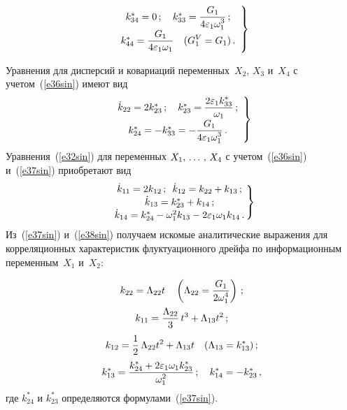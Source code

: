 \begin{multicols}{2}
\noindent
    \begin{equation}
    \left.
    \begin{array}{c}
    k_{34}^* =0\,;\quad k_{33}^* =\displaystyle\frac{\displaystyle G_1\mathstrut}{\displaystyle 4\varepsilon_1 \omega_1^3\mathstrut}\,;\\[3pt]
 k_{44}^* = \displaystyle\frac{\displaystyle G_1\mathstrut}{\displaystyle 4\varepsilon_1 \omega_1\mathstrut}\quad
    (G_1^{V} =G_1)\,.
    \end{array}
    \right \}
    \label{e36sin}
    \end{equation}

Уравнения для дисперсий и ковариаций переменных~$X_2$, $X_3$ и~$X_4$ с учетом~(\ref{e36sin}) имеют вид
          \begin{equation}
    \left.
    \begin{array}{c}
    \dot k_{22} = 2 k_{23}^*\,;\quad k_{23}^* = \displaystyle\frac{\displaystyle  2\varepsilon_1 k_{33}^*\mathstrut}{\displaystyle \omega_1\mathstrut}\,;\\[3pt]
     k_{24}^* =-k_{33}^* =     -\displaystyle\frac{\displaystyle G_1\mathstrut}{\displaystyle 4\varepsilon_1 \omega_1^3\mathstrut}\,.
\end{array}
     \right \}
     \label{e37sin}
     \end{equation}
Уравнения~(\ref{e32sin}) для переменных $X_1,\,\ldots\,,\, X_4$ с учетом~(\ref{e36sin}) и~(\ref{e37sin}) приобретают вид
\begin{equation}
\!\!    \left.
    \begin{array}{c}
    \dot k_{11}= 2 k_{12}\,;\enskip \dot k_{12} = k_{22} + k_{13}\,;\\[1pt]
    \dot k_{13} = k_{23}^* + k_{14}\,;\\[1pt]
 \dot k_{14} = k_{24}^* - \omega_1^2 k_{13} - 2\varepsilon_1 \omega_1 k_{14}\,.
 \end{array}\!\!
 \right \}\!\!
 \label{e38sin}
 \end{equation}
Из~(\ref{e37sin}) и~(\ref{e38sin}) получаем искомые аналитические выражения для корреляционных 
характеристик флуктуационного дрейфа по информационным переменным~$X_1$ и~$X_2$:

\noindent
\begin{gather}
k_{22} =\Lambda_{22} t \quad \left( \Lambda_{22} = \displaystyle\frac{\displaystyle G_1\mathstrut}{\displaystyle  2\omega_1^4\mathstrut}\right)\,;\label{e39sin}\\
k_{11} =\displaystyle\frac{\displaystyle \Lambda_{22}\mathstrut}{\displaystyle 3\mathstrut}\, t^3 + \Lambda_{13} t^2\,;\label{e40sin}\\
k_{12} = \displaystyle\frac{\displaystyle 1\mathstrut}{\displaystyle 2\mathstrut}\, \Lambda_{22} t^2 +\Lambda_{13} t \quad ( \Lambda_{13} = k_{13}^*)\,;\label{e41sin}\\
k_{13}^* =\displaystyle\frac{\displaystyle k_{24}^* + 2 \varepsilon_1 \omega_1 k_{23}^*\mathstrut}{\displaystyle \omega_1^2\mathstrut}\,;\quad k_{14}^* =- k_{23}^*\,,\label{e42sin}
\end{gather}
где $k_{24}^*$ и $k_{23}^*$ определяются формулами~(\ref{e37sin}).


\end{multicols}
